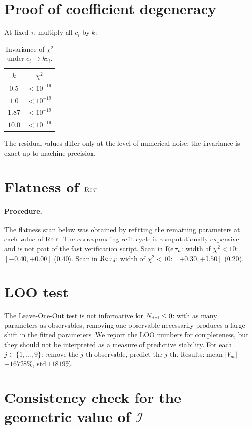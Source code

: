 \documentclass[12pt,a4paper]{article}
\numberwithin{equation}{section}
\begin{document}
\section{Proof of coefficient degeneracy}
At fixed \(\tau\), multiply all \(c_i\) by \(k\):
\begin{table}[H]
\centering
\caption{Invariance of \(\chi^2\) under \(c_i\to kc_i\).}
\begin{tabular}{cc}
\toprule
\(k\) & \(\chi^2\) \\
\midrule
\(0.5\)  & \(< 10^{-19}\) \\
\(1.0\)  & \(< 10^{-19}\) \\
\(1.87\) & \(< 10^{-19}\) \\
\(10.0\) & \(< 10^{-19}\) \\
\bottomrule
\end{tabular}
\end{table}
The residual values differ only at the level of numerical noise; the invariance is exact up to machine precision.

\section{Flatness of \({\rm Re}\,\tau\)}
\paragraph{Procedure.}
The flatness scan below was obtained by refitting the remaining parameters at each value of \({\rm Re}\,\tau\). The corresponding refit cycle is computationally expensive and is not part of the fast verification script.
Scan in \({\rm Re}\,\tau_u\): width of \(\chi^2<10\): \([-0.40, +0.00]\) (\(0.40\)). Scan in \({\rm Re}\,\tau_d\): width of \(\chi^2<10\): \([+0.30, +0.50]\) (\(0.20\)).

\section{LOO test}
The Leave-One-Out test is not informative for \(N_{\rm dof} \le 0\): with as many parameters as observables, removing one observable necessarily produces a large shift in the fitted parameters. We report the LOO numbers for completeness, but they should not be interpreted as a measure of predictive stability. For each \(j\in\{1,\ldots,9\}\): remove the \(j\)-th observable, predict the \(j\)-th. Results: mean \(|V_{ub}|\) \(+16728\%\), std \(11819\%\).

\section{Consistency check for the geometric value of \(\mathcal I\)}
\label{app:I_check}
\end{document}
